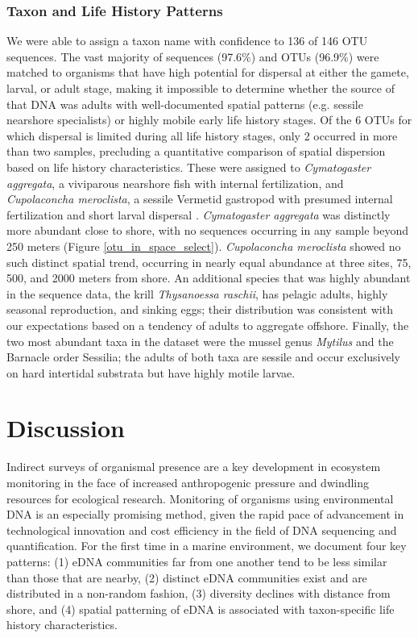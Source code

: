 \documentclass[11pt,letterpaper]{article} %
\begin{document}
\subsubsection*{Taxon and Life History Patterns}
We were able to assign a taxon name with confidence to 136 of 146 OTU sequences. The vast majority of sequences (97.6\%) and OTUs (96.9\%) were matched to organisms that have high potential for dispersal at either the gamete, larval, or adult stage, making it impossible to determine whether the source of that DNA was adults with well-documented spatial patterns (e.g. sessile nearshore specialists) or highly mobile early life history stages. Of the 6 OTUs for which dispersal is limited during all life history stages, only 2 occurred in more than two samples, precluding a quantitative comparison of spatial dispersion based on life history characteristics. These were assigned to \textit{Cymatogaster aggregata}, a viviparous nearshore fish with internal fertilization, and \textit{Cupolaconcha meroclista}, a sessile Vermetid gastropod with presumed internal fertilization and short larval dispersal \citep{Strathmann2006, Phillips2010, Calvo2004}. \textit{Cymatogaster aggregata} was distinctly more abundant close to shore, with no sequences occurring in any sample beyond 250 meters (Figure \ref{otu_in_space_select}). \textit{Cupolaconcha meroclista} showed no such distinct spatial trend, occurring in nearly equal abundance at three sites, 75, 500, and 2000 meters from shore. An additional species that was highly abundant in the sequence data, the krill \textit{Thysanoessa raschii}, has pelagic adults, highly seasonal reproduction, and sinking eggs; their distribution was consistent with our expectations based on a tendency of adults to aggregate offshore. Finally, the two most abundant taxa in the dataset were the mussel genus \textit{Mytilus} and the Barnacle order Sessilia; the adults of both taxa are sessile and occur exclusively on hard intertidal substrata but have highly motile larvae.


\section*{Discussion}
Indirect surveys of organismal presence are a key development in ecosystem monitoring in the face of increased anthropogenic pressure and dwindling resources for ecological research. Monitoring of organisms using environmental DNA is an especially promising method, given the rapid pace of advancement in technological innovation and cost efficiency in the field of DNA sequencing and quantification. For the first time in a marine environment, we document four key patterns: (1) eDNA communities far from one another tend to be less similar than those that are nearby, (2) distinct eDNA communities exist and are distributed in a non-random fashion, (3) diversity declines with distance from shore, and (4) spatial patterning of eDNA is associated with taxon-specific life history characteristics.
\end{document}
